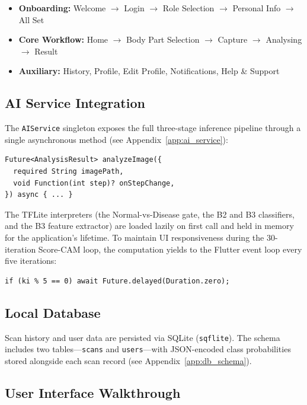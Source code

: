 \begin{itemize}
    \item \textbf{Onboarding:} Welcome $\rightarrow$ Login $\rightarrow$ Role Selection $\rightarrow$ Personal Info $\rightarrow$ All Set
    \item \textbf{Core Workflow:} Home $\rightarrow$ Body Part Selection $\rightarrow$ Capture $\rightarrow$ Analysing $\rightarrow$ Result
    \item \textbf{Auxiliary:} History, Profile, Edit Profile, Notifications, Help \& Support
\end{itemize}

\subsection{AI Service Integration}

The \texttt{AIService} singleton exposes the full three-stage inference pipeline through a single asynchronous method (see Appendix~\ref{app:ai_service}):

\begin{verbatim}
Future<AnalysisResult> analyzeImage({
  required String imagePath,
  void Function(int step)? onStepChange,
}) async { ... }
\end{verbatim}

The TFLite interpreters (the Normal-vs-Disease gate, the B2 and B3 classifiers, and the B3 feature extractor) are loaded lazily on first call and held in memory for the application's lifetime. To maintain UI responsiveness during the 30-iteration Score-CAM loop, the computation yields to the Flutter event loop every five iterations:

\begin{verbatim}
if (ki % 5 == 0) await Future.delayed(Duration.zero);
\end{verbatim}

\subsection{Local Database}

Scan history and user data are persisted via SQLite (\texttt{sqflite}). The schema includes two tables---\texttt{scans} and \texttt{users}---with JSON-encoded class probabilities stored alongside each scan record (see Appendix~\ref{app:db_schema}).

\subsection{User Interface Walkthrough}

